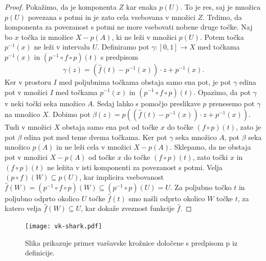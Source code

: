 \documentclass[../TG_magistrsko_delo_sections.tex]{subfiles}
\begin{document}
\begin{proof}
Pokažimo, da je komponenta $Z$ kar enaka $p(U)$. To je res, saj je množica $p(U)$ povezana s potmi in je zato cela vsebovana v množici $Z$. Trdimo, da komponenta za povezanost s potmi ne more vsebovati nobene druge točke. Naj bo $x$ točka iz množice $X - p(A)$, ki ne leži v množici $p(U)$. Potem točka $p^{-1}(x)$ ne leži v intervalu $U$. Definiramo pot $\gamma : [0, 1] \to X$ med točkama $p^{-1}(x)$ in $(p^{-1} \circ f  \circ p)(t)$ s predpisom 
$$\gamma(z) = (\widehat{f}(t) - p^{-1}(x)) \cdot z + p^{-1}(x).$$ 
Ker v prostoru $I$ med poljubnima točkama obstaja samo ena pot, je pot $\gamma$ edina pot v množici $I$ med točkama $p^{-1}(x)$ in $(p^{-1} \circ f \circ p)(t)$. 
Opazimo, da pot $\gamma$ v neki točki seka množico $A$. Sedaj lahko s pomočjo preslikave $p$ prenesemo pot $\gamma$ na množico $X$. Dobimo pot $\beta(z) =p((\widehat{f}(t) - p^{-1}(x)) \cdot z + p^{-1}(x))$. Tudi v množici $X$ obstaja samo ena pot od točke $x$ do točke $(f \circ p)(t)$, zato je pot $\beta$ edina pot med teme dvema točkama. Ker pot $\gamma$ seka množico $A$, pot $\beta$ seka množico $p(A)$ in ne leži cela v množici $X - p(A)$. Sklepamo, da ne obstaja pot v množici $X - p(A)$ od točke $x$ do točke $(f \circ p)(t)$, zato točki $x$ in $(f \circ p)(t)$ ne ležita v isti komponenti za povezanost s potmi. Velja $(p \circ f)(W) \subseteq p(U)$, kar implicira vsebovanost $\widehat{f}(W) = (p^{-1} \circ f \circ p)(W) \subseteq (p^{-1} \circ p)(U) = U$. Za poljubno točko $t$ in poljubno odprto okolico $U$ točke $\widehat{f}(t)$ smo našli odprto okolico $W$ točke $t$, za katero velja $\widehat{f}(W) \subseteq U$, kar dokaže zveznost funkcije $\widehat{f}$. 
\end{proof}

\begin{figure}[h]
  \centering
  \texttt{[image: vk-shark.pdf]}
  \caption[Varšavska krožnica]{Slika prikazuje primer varšavske krožnice določene s predpisom p iz definicije.}
  \label{fig:varšavski}
\end{figure}
\end{document}
